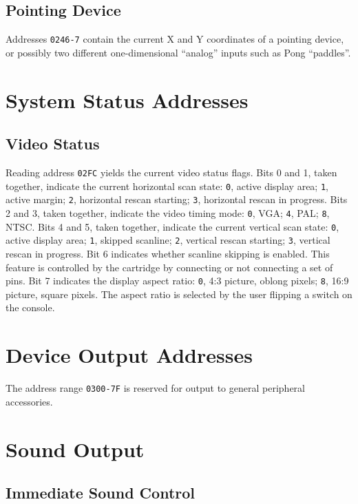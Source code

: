\documentclass[12pt]{{memoir}}
\begin{document}
\subsection{Pointing Device}

Addresses \texttt{0246-7} contain the current X and Y coordinates of a pointing device, or possibly two different one-dimensional ``analog'' inputs such as Pong ``paddles''.

\section{System Status Addresses}
\label{sec:otherinput}

\subsection{Video Status}
\label{ss:videostatusbyte}

Reading address \texttt{02FC} yields the current video status flags. Bits 0 and 1, taken together, indicate the current horizontal scan state: \texttt{0}, active display area; \texttt{1}, active margin; \texttt{2}, horizontal rescan starting; \texttt{3}, horizontal rescan in progress. Bits 2 and 3, taken together, indicate the video timing mode: \texttt{0}, VGA; \texttt{4}, PAL; \texttt{8}, NTSC. Bits 4 and 5, taken together, indicate the current vertical scan state: \texttt{0}, active display area; \texttt{1}, skipped scanline; \texttt{2}, vertical rescan starting; \texttt{3}, vertical rescan in progress. Bit 6 indicates whether scanline skipping is enabled. This feature is controlled by the cartridge by connecting or not connecting a set of pins. Bit 7 indicates the display aspect ratio: \texttt{0}, 4:3 picture, oblong pixels; \texttt{8}, 16:9 picture, square pixels. The aspect ratio is selected by the user flipping a switch on the console.

\section{Device Output Addresses}
\label{sec:devoutput}

The address range \texttt{0300-7F} is reserved for output to general peripheral accessories.

\section{Sound Output}
\label{sec:soundoutput}

\subsection{Immediate Sound Control}
\end{document}
